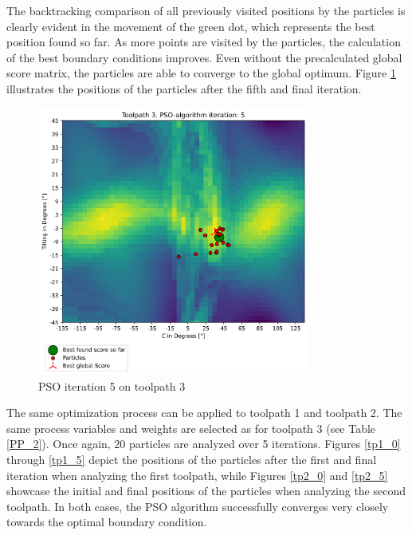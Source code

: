 The backtracking comparison of all previously visited positions by the particles is clearly evident in the movement of the green dot, which represents the best position found so far. As more points are visited by the particles, the calculation of the best boundary conditions improves. Even without the precalculated global score matrix, the particles are able to converge to the global optimum.
Figure \ref{5_true} illustrates the positions of the particles after the fifth and final iteration.
\newpage
\begin{figure}[H]
	\centerline{\includegraphics[width=0.8\textwidth]{figures/swarm_true/3_5.png}}
	\caption{PSO iteration 5 on toolpath 3}
	\label{5_true}
\end{figure}



The same optimization process can be applied to toolpath 1 and toolpath 2. The same process variables and weights are selected as for toolpath 3 (see Table \ref{PP_2}). Once again, 20 particles are analyzed over 5 iterations. Figures \ref{tp1_0} through \ref{tp1_5} depict the positions of the particles after the first and final iteration when analyzing the first toolpath, while Figures \ref{tp2_0} and \ref{tp2_5} showcase the initial and final positions of the particles when analyzing the second toolpath. In both cases, the PSO algorithm successfully converges very closely towards the optimal boundary condition.
\newpage
	
